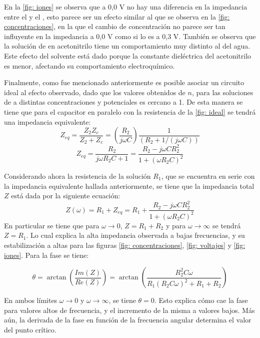 \documentclass[fleqn,11pt]{SelfArx}
\begin{document}
	En la \autoref{fig: iones} se observa que a 0,0 V no hay una diferencia en la impedancia entre el  y el , esto parece ser un efecto similar al que se observa en la \autoref{fig: concentraciones}, en la que el cambio de concentración no parece ser tan influyente en la impedancia a 0,0 V como si lo es a 0,3 V. También se observa que la solución de  en acetonitrilo tiene un comportamiento muy distinto al del agua. Este efecto del solvente está dado porque la constante dieléctrica del acetonitrilo es menor, afectando su comportamiento electroquímico. 
	
	Finalmente, como fue mencionado anteriormente es posible asociar un circuito ideal al efecto observado, dado que los valores obtenidos de $n$, para las soluciones de  a distintas concentraciones y potenciales es cercano a 1. De esta manera se tiene que para el capacitor en paralelo con la resistencia de la \autoref{fig: ideal} se tendr\'a una impedancia equivalente:
	\begin{equation*}
		Z_{eq} = \dfrac{Z_2Z_c}{Z_2 + Z_c} = \left(\dfrac{R_2}{j\omega C}\right)\dfrac{1}{(R_2 + 1/(j\omega C))}
	\end{equation*}
	\begin{equation}
		Z_{eq} = \dfrac{R_2}{j\omega R_2C + 1} = \dfrac{R_2 - j\omega CR_2^2}{1+(\omega R_2C)^2}
	\end{equation}
	
	Considerando ahora la resistencia de la soluci\'on $R_1$, que se encuentra en serie con la impedancia equivalente hallada anteriormente, se tiene que la impedancia total $Z$ est\'a dada por la siguiente ecuaci\'on:
	\begin{equation}
		Z(\omega) = R_1 + Z_{eq} =  R_1 + \dfrac{R_2 - j\omega CR_2^2}{1+(\omega R_2C)^2}
	\end{equation}
	En particular se tiene que para $\omega \rightarrow 0$, $Z = R_1 + R_2$ y para $\omega \rightarrow \infty$ se tendr\'a $Z = R_1$. Lo cual explica la alta impedancia observada a bajas frecuencias, y su estabilizaci\'on a altas para las figuras \ref{fig: concentraciones}, \ref{fig: voltajes} y \ref{fig: iones}. Para la fase se tiene:
	
	\footnotesize
	\begin{equation}
		\theta = \arctan\left(\dfrac{Im(Z)}{Re(Z)}\right) = \arctan\left(\dfrac{R_2^2C\omega}{R_1(R_2C\omega)^2 + R_1 + R_2}\right)
	\end{equation}
	\normalsize
	
	En ambos l\'imites $\omega\rightarrow 0$ y $\omega\rightarrow \infty$, se tiene $\theta = 0$. Esto explica c\'omo cae la fase para valores altos de frecuencia, y el incremento de la misma a valores bajos. M\'as a\'un, la derivada de la fase en funci\'on de la frecuencia angular determina el valor del punto cr\'itico.
	
\end{document}
